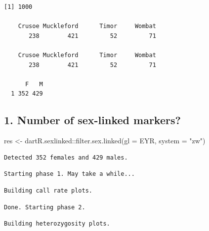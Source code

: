 \documentclass[
  letterpaper,
  DIV=11,
  numbers=noendperiod]{scrreprt}
\newenvironment{Shaded}{\begin{snugshade}}{\end{snugshade}}
\newcommand{\AttributeTok}[1]{\textcolor[rgb]{0.49,0.56,0.16}{#1}}
\newcommand{\FunctionTok}[1]{\textcolor[rgb]{0.02,0.16,0.49}{#1}}
\newcommand{\NormalTok}[1]{\textcolor[rgb]{0.00,0.44,0.13}{#1}}
\newcommand{\OtherTok}[1]{\textcolor[rgb]{0.00,0.44,0.13}{#1}}
\newcommand{\SpecialCharTok}[1]{\textcolor[rgb]{0.25,0.44,0.63}{#1}}
\newcommand{\StringTok}[1]{\textcolor[rgb]{0.25,0.44,0.63}{#1}}
\let\textttOrig\texttt
\renewcommand{\texttt}[1]{\textttOrig{\color{blue}{#1}}}
\begin{document}
\begin{verbatim}
[1] 1000

    Crusoe Muckleford      Timor     Wombat 
       238        421         52         71 

    Crusoe Muckleford      Timor     Wombat 
       238        421         52         71 

      F   M 
  1 352 429 
\end{verbatim}

\hypertarget{number-of-sex-linked-markers-1}{%
\subsection*{1. Number of sex-linked
markers?}\label{number-of-sex-linked-markers-1}}

\begin{Shaded}
\begin{Highlighting}[]
\NormalTok{res }\OtherTok{\textless{}{-}}\NormalTok{ dartR.sexlinked}\SpecialCharTok{::}\FunctionTok{filter.sex.linked}\NormalTok{(}\AttributeTok{gl =}\NormalTok{ EYR, }\AttributeTok{system =} \StringTok{"zw"}\NormalTok{)}
\end{Highlighting}
\end{Shaded}

\begin{verbatim}
Detected 352 females and 429 males.
\end{verbatim}

\begin{verbatim}
Starting phase 1. May take a while...
\end{verbatim}

\begin{verbatim}
Building call rate plots.
\end{verbatim}

\begin{figure}[H]

{\centering \texttt{[image: Session10\_SexLinkedMarkers\_files/figure-pdf/unnamed-chunk-11-1.pdf]}

}

\end{figure}

\begin{verbatim}
Done. Starting phase 2.
\end{verbatim}

\begin{verbatim}
Building heterozygosity plots.
\end{verbatim}
\end{document}
